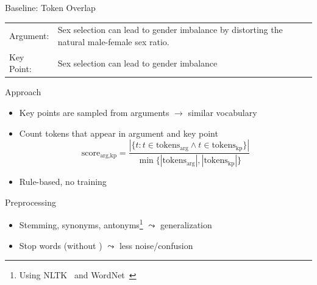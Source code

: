 \documentclass[english,handout]{mlutalk}
\begin{document}
\begin{frame}[allowframebreaks]{Baseline: Token Overlap}
  \begin{example}
    \smaller\renewcommand{\arraystretch}{1.15}
    \begin{tabularx}{0.65\linewidth}{@{}lX@{}}
      Argument: & \textcolor{Magenta4}{Sex} \textcolor{OliveDrab4}{selection} can lead to \textcolor{Orange2}{gender} \textcolor{DodgerBlue3}{imbalance} by distorting the natural male-female \textcolor{Magenta4}{sex} ratio. \\
      Key Point: & \textcolor{Magenta4}{Sex} \textcolor{OliveDrab4}{selection} can lead to \textcolor{Orange2}{gender} \textcolor{DodgerBlue3}{imbalance}
    \end{tabularx}
  \end{example}
  
  \begin{block}{Approach}
    \begin{itemize}
      \item Key points are sampled from arguments \(\to\) similar vocabulary
      \item Count tokens that appear in argument and key point
      {\smaller\begin{equation*}
        \text{score}_{\text{arg},\text{kp}} = \frac{ | \{ t : t \in \text{tokens}_\text{arg} \land t \in \text{tokens}_\text{kp} \} | }{ \min\{ |\text{tokens}_\text{arg}|, |\text{tokens}_\text{kp}| \} }
      \end{equation*}}
      \item Rule-based, no training
    \end{itemize}
  \end{block}

  \begin{block}{Preprocessing}
    \begin{itemize}
      \item Stemming, synonyms, antonyms\footnote{Using NLTK~\cite{Bird2006} and WordNet~\cite{Miller1995}} \(\leadsto\) generalization
      \item Stop words (without ) \(\leadsto\) less noise/confusion
    \end{itemize}
  \end{block}

\end{frame}
\end{document}
